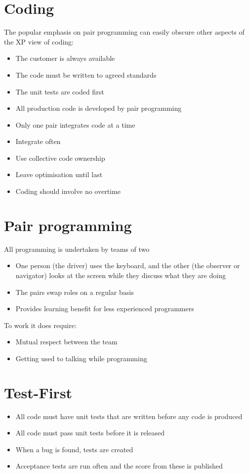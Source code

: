 \documentclass{article}[18pt]
\begin{document}
\section{Coding}
The popular emphasis on pair programming can easily obscure other aspects of the XP view of coding:
\begin{itemize}
	\item The customer is always available
	\item The code must be written to agreed standards
	\item The unit tests are coded first
	\item All production code is developed by pair programming
	\item Only one pair integrates code at a time
	\item Integrate often
	\item Use collective code ownership
	\item Leave optimisation until last
	\item Coding should involve no overtime
\end{itemize}
\section{Pair programming}
All programming is undertaken by teams of two
\begin{itemize}
	\item One person (the driver) uses the keyboard, and the other (the observer or navigator) looks at the screen while they discuss what they are doing
	\item The pairs swap roles on a regular basis
	\item Provides learning benefit for less experienced programmers
\end{itemize}
To work it does require:
\begin{itemize}
	\item Mutual respect between the team
	\item Getting used to talking while programming
\end{itemize}
\section{Test-First}
\begin{itemize}
	\item All code must have unit tests that are written before any code is produced
	\item All code must pass unit tests before it is released
	\item When a bug is found, tests are created
	\item Acceptance tests are run often and the score from these is published
\end{itemize}
\end{document}
